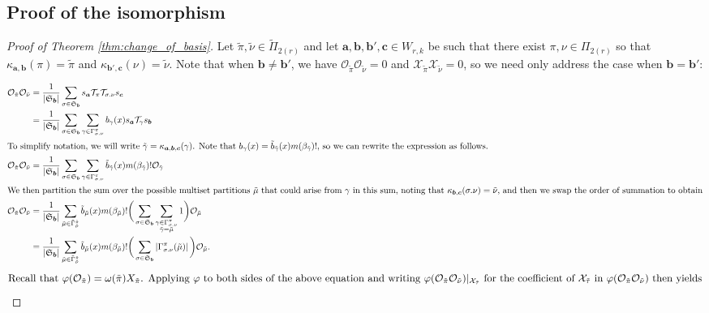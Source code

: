 \documentclass[ALCO,Unicode,published]{cedram}
\newcommand{\TT}{\mathcal{T}}
\newcommand{\XX}{\mathcal{X}}
\newcommand{\OO}{\mathcal{O}}
\newcommand{\SG}{\mathfrak{S}}
\newcommand{\bfa}{{\boldsymbol{a}}}
\newcommand{\bfb}{{\boldsymbol{b}}}
\newcommand{\bfc}{{\boldsymbol{c}}}
\newcommand{\ttau}{{\tilde{\tau}}}
\newcommand{\tpi}{{\tilde{\pi}}}
\newcommand{\tgamma}{{\tilde{\gamma}}}
\newcommand{\tmu}{{\tilde{\mu}}}
\newcommand{\tnu}{{\tilde{\nu}}}
\newcommand{\abs}[1]{\left| #1\right |}
\begin{document}
\subsection{Proof of the isomorphism}

\begin{proof}[Proof of Theorem \ref{thm:change_of_basis}]
    Let $\tpi,\tnu\in\tilde\Pi_{2(r)}$ and let $\bfa,\bfb,\bfb',\bfc\in W_{r,k}$ be such that there exist $\pi,\nu\in\Pi_{2(r)}$ so that $\kappa_{\bfa,\bfb}(\pi)=\tpi$ and $\kappa_{\bfb',\bfc}(\nu)=\tnu$. Note that when $\bfb\neq\bfb'$, we have $\OO_\tpi\OO_\tnu=0$ and $\XX_\tpi \XX_\tnu=0$, so we need only address the case when $\bfb=\bfb'$:

    \begin{align*}
        \OO_\tpi\OO_\tnu&=\frac{1}{\abs{\SG_\bfb}}\sum_{\sigma\in\SG_\bfb}s_\bfa\TT_\pi\TT_{\sigma.\nu}s_\bfc\\
        &=\frac{1}{\abs{\SG_\bfb}}\sum_{\sigma\in\SG_\bfb}\sum_{\gamma\in\Gamma^\pi_{\sigma.\nu}} b_\gamma(x) s_\bfa \TT_\gamma s_\bfb\\
        \intertext{To simplify notation, we will write $\tgamma=\kappa_{\bfa,\bfb,\bfc}(\gamma)$. Note that $b_\gamma(x)=\tilde{b}_{\tgamma}(x)m(\beta_\tgamma)!$, so we can rewrite the expression as follows.}
        \OO_\tpi\OO_\tnu&=\frac{1}{\abs{\SG_\bfb}}\sum_{\sigma\in\SG_\bfb}\sum_{\gamma\in\Gamma^\pi_{\sigma.\nu}} \tilde{b}_\tgamma(x)m(\beta_\tgamma)! \OO_{\tgamma}\\
        \intertext{We then partition the sum over the possible multiset partitions $\tmu$ that could arise from $\gamma$ in this sum, noting that $\kappa_{\bfb,\bfc}(\sigma.\nu)=\tnu$, and then we swap the order of summation to obtain}
        \OO_\tpi\OO_\tnu&=\frac{1}{\abs{\SG_\bfb}}\sum_{\tmu\in\tilde\Gamma_{\tnu}^\tpi} \tilde{b}_\tmu(x)m(\beta_\tmu)!\bigg(\sum_{\sigma\in\SG_\bfb}\sum_{\substack{\gamma\in\Gamma^\pi_{\sigma.\nu}\\\tgamma=\tmu}}1\bigg)\OO_\tmu\\
        &=\frac{1}{\abs{\SG_\bfb}}\sum_{\tmu\in\tilde\Gamma_{\tnu}^\tpi} \tilde{b}_\tmu(x)m(\beta_\tmu)!\bigg(\sum_{\sigma\in\SG_\bfb}\abs{\Gamma^\pi_{\sigma.\nu}(\tmu)}\bigg)\OO_\tmu.
    \end{align*}
    \begin{align}
        \intertext{Recall that $\varphi(\OO_\tpi)=\omega(\tpi)X_\tpi$. Applying $\varphi$ to both sides of the above equation and writing $\varphi(\OO_\tpi\OO_\tnu)|_{\XX_\ttau}$ for the coefficient of $\XX_\ttau$ in $\varphi(\OO_\tpi\OO_\tnu)$ then yields}

\end{align}
\end{proof}
\end{document}
